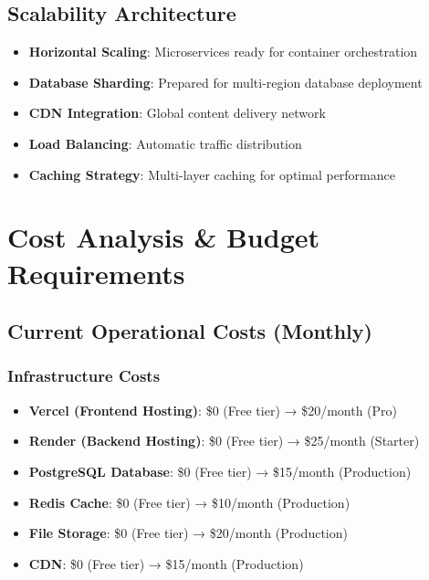 \documentclass[11pt,a4paper]{article}
\begin{document}
\subsection{Scalability Architecture}
\begin{itemize}
    \item \textbf{Horizontal Scaling}: Microservices ready for container orchestration
    \item \textbf{Database Sharding}: Prepared for multi-region database deployment
    \item \textbf{CDN Integration}: Global content delivery network
    \item \textbf{Load Balancing}: Automatic traffic distribution
    \item \textbf{Caching Strategy}: Multi-layer caching for optimal performance
\end{itemize}

\section{Cost Analysis \& Budget Requirements}

\subsection{Current Operational Costs (Monthly)}

\subsubsection{Infrastructure Costs}
\begin{itemize}
    \item \textbf{Vercel (Frontend Hosting)}: \$0 (Free tier) → \$20/month (Pro)
    \item \textbf{Render (Backend Hosting)}: \$0 (Free tier) → \$25/month (Starter)
    \item \textbf{PostgreSQL Database}: \$0 (Free tier) → \$15/month (Production)
    \item \textbf{Redis Cache}: \$0 (Free tier) → \$10/month (Production)
    \item \textbf{File Storage}: \$0 (Free tier) → \$20/month (Production)
    \item \textbf{CDN}: \$0 (Free tier) → \$15/month (Production)
\end{itemize}
\end{document}
